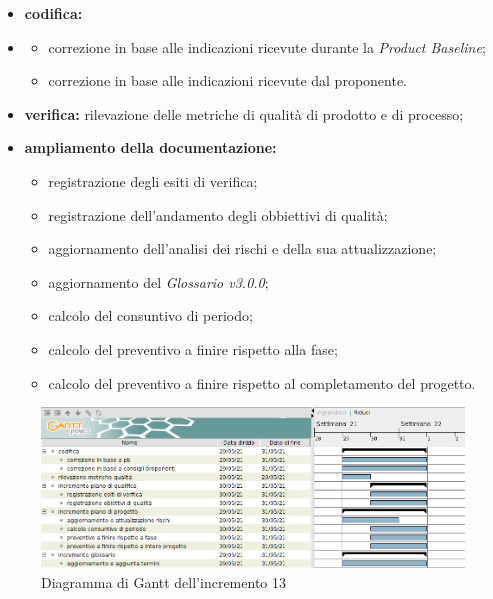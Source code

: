 \begin{itemize}
    \item\textbf{codifica:}
    \item \begin{itemize}
              \item correzione in base alle indicazioni ricevute durante la \textit{Product Baseline};
              \item correzione in base alle indicazioni ricevute dal proponente.
          \end{itemize}
    \item \textbf{verifica:} rilevazione delle metriche di qualità di prodotto e di processo;
    \item \textbf{ampliamento della documentazione:}
          \begin{itemize}
              \item registrazione degli esiti di verifica;
              \item registrazione dell'andamento degli obbiettivi di qualità;
              \item aggiornamento dell'analisi dei rischi e della sua attualizzazione;
              \item aggiornamento del \textit{Glossario v3.0.0};
              \item calcolo del consuntivo di periodo;
              \item calcolo del preventivo a finire rispetto alla fase;
              \item calcolo del preventivo a finire rispetto al completamento del progetto.
          \end{itemize}
\end{itemize}
\pagebreak
{}
\begin{figure}[!ht]
    \caption{Diagramma di Gantt dell'incremento 13}
    \vspace{5px}
    \includegraphics[scale=0.3]{../../../Images/Diagrammi/Gantt/incremento13.png}
    \centering
\end{figure}


